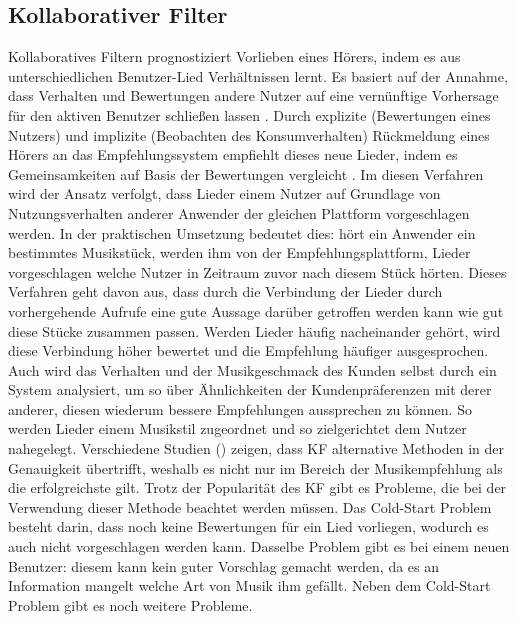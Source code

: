 \documentclass[twosided,a4,10pt]{article}
\begin{document}
\begin{multicols}{2}
		\subsection{Kollaborativer Filter}
		Kollaboratives Filtern prognostiziert Vorlieben eines Hörers, indem es aus unterschiedlichen Benutzer-Lied Verhältnissen lernt. Es basiert auf der Annahme, dass Verhalten und Bewertungen andere Nutzer auf eine vernünftige Vorhersage für den aktiven Benutzer schließen lassen \cite{celma}. Durch explizite (Bewertungen eines Nutzers) und implizite (Beobachten des Konsumverhalten) Rückmeldung eines Hörers an das Empfehlungssystem empfiehlt dieses neue Lieder, indem es Gemeinsamkeiten auf Basis der Bewertungen vergleicht \cite{mcfee}.\newline
		Im diesen Verfahren wird der Ansatz verfolgt, dass Lieder einem Nutzer auf Grundlage von Nutzungsverhalten anderer Anwender der gleichen Plattform vorgeschlagen werden. In der praktischen Umsetzung bedeutet dies: hört ein Anwender ein bestimmtes Musikstück, werden ihm von der Empfehlungsplattform, Lieder vorgeschlagen welche Nutzer in Zeitraum zuvor nach diesem Stück hörten. Dieses Verfahren geht davon aus, dass durch die Verbindung der Lieder durch vorhergehende Aufrufe eine gute Aussage darüber getroffen werden kann wie gut diese Stücke zusammen passen. Werden Lieder häufig nacheinander gehört, wird diese Verbindung höher bewertet und die Empfehlung häufiger ausgesprochen. Auch wird das Verhalten und der Musikgeschmack des Kunden selbst durch ein System analysiert, um so über Ähnlichkeiten der Kundenpräferenzen mit derer anderer, diesen wiederum bessere Empfehlungen aussprechen zu können. So werden Lieder einem Musikstil zugeordnet und so zielgerichtet dem Nutzer nahegelegt.\newline
		Verschiedene Studien (\cite{mcfee}\cite{barrington}) zeigen, dass KF alternative Methoden in der Genauigkeit übertrifft, weshalb es nicht nur im Bereich der Musikempfehlung als die erfolgreichste gilt.\newline
		Trotz der Popularität des KF gibt es Probleme, die bei der Verwendung dieser Methode beachtet werden müssen. Das Cold-Start Problem besteht darin, dass noch keine Bewertungen für ein Lied vorliegen, wodurch es auch nicht vorgeschlagen werden kann. Dasselbe Problem gibt es bei einem neuen Benutzer: diesem kann kein guter Vorschlag gemacht werden, da es an Information mangelt welche Art von Musik ihm gefällt. Neben dem Cold-Start Problem gibt es noch weitere Probleme. \cite{celma} 
		

\end{multicols}
\end{document}
